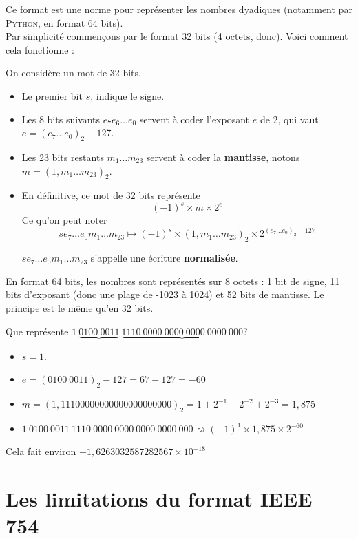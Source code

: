 \documentclass[a4paper,12pt,french]{book}
\begin{document}
Ce format est une norme pour représenter les nombres dyadiques (notamment par \textsc{Python}, en format 64 bits).\\
Par simplicité commençons par le format 32 bits (4 octets, donc).
Voici comment cela fonctionne :

\begin{definition}
On considère un mot de 32 bits.
\begin{itemize}
\item Le premier bit $s$, indique le signe.
\item Les 8 bits suivants  $e_7e_6\ldots e_0$ servent à coder l'exposant $e$ de 2, qui vaut $e=(e_7\ldots e_0)_2-127$.
\item Les 23 bits restants $m_1\ldots m_{23}$ servent à coder la \textbf{mantisse}, notons $m=(1,m_1\ldots m_{23})_2$.
\item En définitive, ce mot de 32 bits représente $$\boxed{(-1)^s\times m\times 2^e}$$
		Ce qu'on peut noter
		$$se_7\ldots e_0m_1\ldots m_{23}\mapsto (-1)^s\times(1,m_1\ldots m_{23})_2\times 2^{(e_7\ldots e_0)_2-127}$$

		$se_7\ldots e_0m_1\ldots m_{23}$ s'appelle une écriture \textbf{normalisée}.
\end{itemize}

En format 64 bits, les nombres sont représentés sur 8 octets : 1 bit de signe, 11 bits d'exposant (donc une plage de -1023 à 1024) et 52 bits de
mantisse. Le principe est le même qu'en 32 bits.
\end{definition}

\begin{exemple}
Que représente $1\ \underbrace{0100\ 0011}\ \underbrace{1110\ 0000\ 0000\ 0000\ 0000\ 000}$?
\begin{itemize}
\item $s = 1$.
\item $e =(0100\ 0011)_2-127=67-127=-60$
\item $m= (\boxed{1},1110 0000 0000 0000 0000 000)_2=1+2^{-1}+2^{-2}+2^{-3}=1,875$
\item $1\ 0100\ 0011\ 1110\ 0000\ 0000\ 0000\ 0000\ 000\rightsquigarrow (-1)^1\times 1,875\times 2^{-60}$
\end{itemize}
Cela fait environ $-1,6263032587282567\times 10^{-18}$
\end{exemple}



\section{Les limitations du format IEEE 754}
\end{document}

